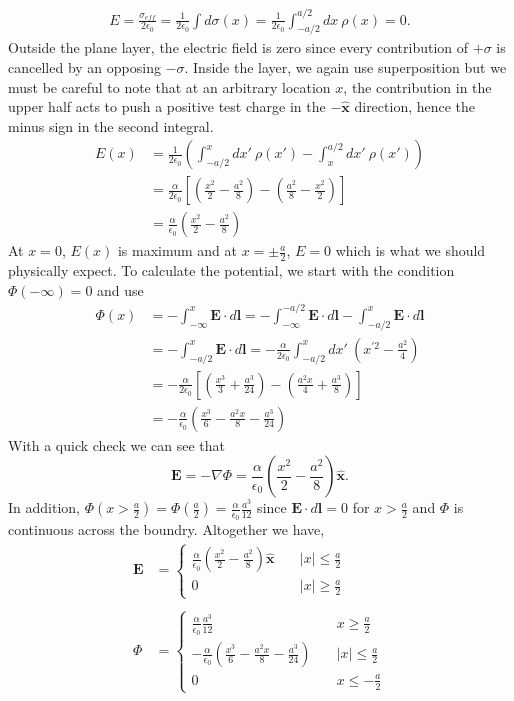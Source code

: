 \documentclass[11pt,letterpaper]{article}
\newcommand{\vect}[1]{\mathbf{#1}}
\begin{document}
\begin{enumerate}
\begin{align*}E = \frac{\sigma_{eff}}{2\epsilon_0}=\frac{1}{2\epsilon_0}\int{d\sigma(x)}= \frac{1}{2\epsilon_0}\int_{-a/2}^{a/2}{dx\ \rho(x)}=0.
\end{align*}
Outside the plane layer, the electric field is zero since every contribution of $+\sigma$ is cancelled by an opposing $-\sigma$. Inside the layer, we again use superposition but we must be careful to note that at an arbitrary location $x$, the contribution in the upper half acts to push a positive test charge in the $-\hat{\vect x}$ direction, hence the minus sign in the second integral.
\begin{align*}E(x) &= \frac{1}{2\epsilon_0}\left(\int_{-a/2}^{x}{dx'\ \rho(x')}-\int_{x}^{a/2}{dx'\ \rho(x')}\right)\\
&=\frac{\alpha}{2\epsilon_0}\left[\left(\frac{x^2}{2}-\frac{a^2}{8}\right)-\left(\frac{a^2}{8}-\frac{x^2}{2}\right)\right]\\
&=\frac{\alpha}{\epsilon_0}\left(\frac{x^2}{2}-\frac{a^2}{8}\right)
\end{align*}
At $x=0$, $E(x)$ is maximum and at $x=\pm\frac{a}{2}$, $E=0$ which is what we should physically expect. To calculate the potential, we start with the condition $\Phi(-\infty)=0$ and use
\begin{align*}\Phi(x) &= -\int_{-\infty}^{x}{\vect E\cdot d\vect{l}} = -\int_{-\infty}^{-a/2}{\vect{E}\cdot d\vect{l}} - \int_{-a/2}^{x}{\vect E\cdot d\vect{l}}\\
&= -\int_{-a/2}^{x}{\vect E\cdot d\vect{l}} = -\frac{\alpha}{2\epsilon_0}\int_{-a/2}^{x}{dx'\ (x^{'2}-\frac{a^2}{4})}\\
&=-\frac{\alpha}{2\epsilon_0}\left[\left(\frac{x^3}{3}+\frac{a^3}{24}\right)-\left(\frac{a^2x}{4}+\frac{a^3}{8}\right)\right]\\
&=-\frac{\alpha}{\epsilon_0}\left(\frac{x^3}{6} -\frac{a^2x}{8}-\frac{a^3}{24}\right)
\end{align*}
With a quick check we can see that
$$\vect E = -\nabla \Phi = \frac{\alpha}{\epsilon_0}\left(\frac{x^2}{2}-\frac{a^2}{8}\right)\hat{\vect x}.$$
In addition, $\Phi(x>\frac{a}{2}) = \Phi(\frac{a}{2}) = \frac{\alpha}{\epsilon_0}\frac{a^3}{12}$ since $\vect E\cdot d\vect l = 0$ for $x>\frac{a}{2}$ and $\Phi$ is continuous across the boundry. Altogether we have,
\begin{align*}
\vect E& = \begin{cases}\frac{\alpha}{\epsilon_0}\left(\frac{x^2}{2}-\frac{a^2}{8}\right)\hat{\vect x}&\quad |x|\leq\frac{a}{2}\\
0&\quad |x|\geq\frac{a}{2}\end{cases}
\\ \\\Phi & = \begin{cases} \frac{\alpha}{\epsilon_0}\frac{a^3}{12}&\quad x\geq \frac{a}{2}
\\-\frac{\alpha}{\epsilon_0}\left(\frac{x^3}{6} -\frac{a^2x}{8}-\frac{a^3}{24}\right)&\quad |x|\leq\frac{a}{2}
\\0&\quad x\leq-\frac{a}{2}\end{cases}
\end{align*}


\end{enumerate}
\end{document}
